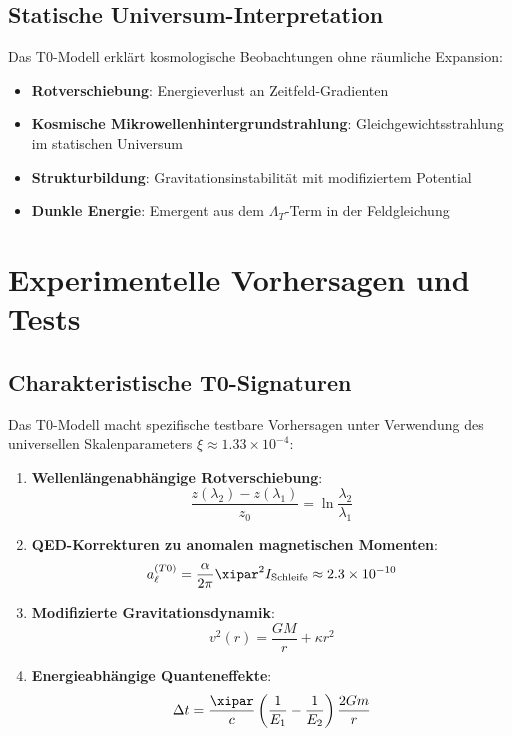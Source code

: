 	

	\subsection{Statische Universum-Interpretation}
	\label{subsec:statisches_universum}
	
	Das T0-Modell erklärt kosmologische Beobachtungen ohne räumliche Expansion:
	\begin{itemize}
		\item \textbf{Rotverschiebung}: Energieverlust an Zeitfeld-Gradienten
		\item \textbf{Kosmische Mikrowellenhintergrundstrahlung}: Gleichgewichtsstrahlung im statischen Universum
		\item \textbf{Strukturbildung}: Gravitationsinstabilität mit modifiziertem Potential
		\item \textbf{Dunkle Energie}: Emergent aus dem $\Lambda_T$-Term in der Feldgleichung
	\end{itemize}
	
	\section{Experimentelle Vorhersagen und Tests}
	\label{sec:experimentelle_vorhersagen}
	
	\subsection{Charakteristische T0-Signaturen}
	\label{subsec:charakteristische_signaturen}
	
	Das T0-Modell macht spezifische testbare Vorhersagen unter Verwendung des universellen Skalenparameters $\xi \approx 1.33 \times 10^{-4}$:
	
	\begin{enumerate}
		\item \textbf{Wellenlängenabhängige Rotverschiebung}:
		\begin{equation}
			\frac{z(\lambda_2) - z(\lambda_1)}{z_0} = \ln\frac{\lambda_2}{\lambda_1}
			\label{eq:wellenlaengen_test}
		\end{equation}
		
		\item \textbf{QED-Korrekturen zu anomalen magnetischen Momenten}:
		\begin{equation}
			a_{\ell}^{(T0)} = \frac{\alpha}{2\pi} \xipar^2 I_{\text{Schleife}} \approx 2.3 \times 10^{-10}
			\label{eq:qed_korrektur}
		\end{equation}
		
		\item \textbf{Modifizierte Gravitationsdynamik}:
		\begin{equation}
			v^2(r) = \frac{GM}{r} + \kappa r^2
			\label{eq:rotationskurve_vorhersage}
		\end{equation}
		
		\item \textbf{Energieabhängige Quanteneffekte}:
		\begin{equation}
			\Delta t = \frac{\xipar}{c} \left(\frac{1}{E_1} - \frac{1}{E_2}\right) \frac{2Gm}{r}
			\label{eq:quanten_zeitverzoegerung}
		\end{equation}
	\end{enumerate}
	
